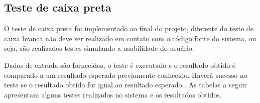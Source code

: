 \subsection{Teste de caixa preta}
O teste de caixa preta foi implementado ao final do projeto, diferente do teste de caixa branca não deve ser realizado em contato com o código fonte do sistema, ou seja, são realizados testes simulando a usabilidade do usuário. 

 Dados de entrada são fornecidos, o teste é executado e o resultado obtido é comparado a um resultado esperado previamente conhecido.
Haverá sucesso no teste se o resultado obtido for igual ao resultado esperado \cite{neto2007introduccao}.
    As tabelas a seguir apresentam alguns testes realizados no sistema e os resultados obtidos.

\begin{table}[H]
\caption{Resultado de teste - Cadastrar produto}
\label{tab:testeCadProduto}
\end{table}


